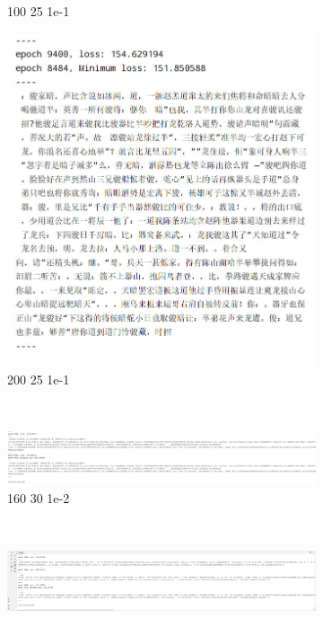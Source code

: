\documentclass[letterpaper,12pt]{article}
\begin{document}
\begin{figure}[htbp]
\begin{subfigure}{0.3\textwidth}
			\captionsetup{font=scriptsize}
			\caption{100 25 1e-1}
			\label{fig: WRNN_result_1}	
		\end{subfigure} 
		\begin{subfigure}{0.3\textwidth}
			\includegraphics[width=\linewidth]{WRNN/result_5}
			\captionsetup{font=scriptsize}
			\caption{200 25 1e-1}
			\label{fig: WRNN_result_5}	
		\end{subfigure} \\
		\begin{subfigure}{\textwidth}
			\includegraphics[width=\linewidth]{WRNN/result_2}
			\captionsetup{font=scriptsize}
			\caption{160 30 1e-2}
			\label{fig: WRNN_result_2}	
		\end{subfigure} \\ 
		\begin{subfigure}{\textwidth}
			\includegraphics[width=\linewidth]{WRNN/result_3}

\end{subfigure}
\end{figure}
\end{document}
